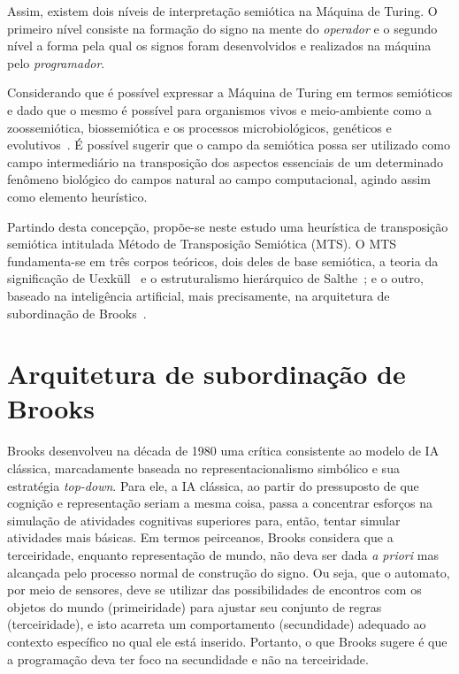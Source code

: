 
Assim, existem dois níveis de interpretação semiótica na Máquina de Turing. O primeiro nível consiste na formação do signo na mente do \emph{operador} e o segundo nível a forma pela qual os signos foram desenvolvidos e realizados na máquina pelo \emph{programador}.

Considerando que é possível expressar a Máquina de Turing em termos semióticos e dado que o mesmo é possível para organismos vivos e meio-ambiente como a zoossemiótica, biossemiótica e os processos microbiológicos, genéticos e evolutivos~\cite{noth95, noth96}. É possível sugerir que o campo da semiótica possa ser utilizado como campo intermediário na transposição dos aspectos essenciais de um determinado fenômeno biológico do campos natural ao campo computacional, agindo assim como elemento heurístico.

Partindo desta concepção, propõe-se neste estudo uma heurística de transposição semiótica intitulada Método de Transposição Semiótica (MTS). O MTS fundamenta-se em três corpos teóricos, dois deles de base semiótica, a teoria da significação de Uexküll~\cite{uexkull34, uexkull82} e o estruturalismo hierárquico de Salthe~\cite{salthe85}; e o outro, baseado na inteligência artificial, mais precisamente, na arquitetura de subordinação de Brooks~\cite{brooks99a, brooks99b, brooks99c}.

\section{Arquitetura de subordinação de Brooks}

Brooks desenvolveu na década de 1980 uma crítica consistente ao modelo de IA clássica, marcadamente baseada no representacionalismo simbólico e sua estratégia \textit{top-down}. Para ele, a IA clássica, ao partir do pressuposto de que cognição e representação seriam a mesma coisa, passa a concentrar esforços na simulação de atividades cognitivas superiores para, então, tentar simular atividades mais básicas. Em termos peirceanos, Brooks considera que a terceiridade, enquanto representação de mundo, não deva ser dada \textit{a priori} mas alcançada pelo processo normal de construção do signo. Ou seja, que o automato, por meio de sensores, deve se utilizar das possibilidades de encontros com os objetos do mundo (primeiridade) para ajustar seu conjunto de regras (terceiridade), e isto acarreta um comportamento (secundidade) adequado ao contexto específico no qual ele está inserido. Portanto, o que Brooks sugere é que a programação deva ter foco na secundidade e não na terceiridade.

